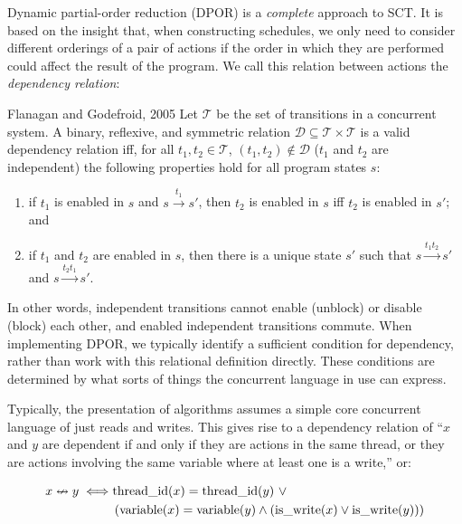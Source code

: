 Dynamic partial-order reduction (DPOR)\cite{flanagan2005,godefroid1996} is a
\emph{complete} approach to SCT\@.  It is based on the insight that, when
constructing schedules, we only need to consider different orderings of a pair
of actions if the order in which they are performed could affect the
result of the program.  We call this relation between actions
the \emph{dependency relation}:

\begin{bquote}{Flanagan and Godefroid, 2005\nocite{flanagan2005}}
  Let $\mathcal T$ be the set of transitions in a concurrent system.  A binary,
  reflexive, and symmetric relation $\mathcal D \subseteq \mathcal
  T \times \mathcal T$ is a valid dependency relation iff, for all $t_{1},
  t_{2} \in \mathcal T$, $(t_{1}, t_{2}) \notin \mathcal D$ ($t_{1}$ and $t_{2}$
  are independent) the following properties hold for all program states $s$:

  \begin{enumerate}
  \item if $t_{1}$ is enabled in $s$ and $s \xrightarrow{t_{1}} s'$, then
    $t_{2}$ is enabled in $s$ iff $t_{2}$ is enabled in $s'$; and

  \item if $t_{1}$ and $t_{2}$ are enabled in $s$, then there is a unique state
    $s'$ such that $s \xrightarrow{t_{1}t_{2}} s'$ and
    $s \xrightarrow{t_{2}t_{1}} s'$.
  \end{enumerate}
\end{bquote}

In other words, independent transitions cannot enable (unblock) or
disable (block) each other, and enabled independent transitions
commute.  When implementing DPOR, we typically identify a sufficient
condition for dependency, rather than work with this relational
definition directly.  These conditions are determined by what sorts of
things the concurrent language in use can express.

Typically, the presentation of algorithms assumes a simple core
concurrent language of just reads and writes.  This gives rise to a
dependency relation of ``$x$ and $y$ are dependent if and only if they
are actions in the same thread, or they are actions involving the same
variable where at least one is a write,'' or:

\begin{align*}
  x \nleftrightarrow y \iff& \mathrm{thread\_id}(x) = \mathrm{thread\_id}(y)~\lor\\
    &\left(\mathrm{variable}(x) = \mathrm{variable}(y)
     \land \left(\mathrm{is\_write}(x) \lor \mathrm{is\_write}(y)\right)\right)
\end{align*}

